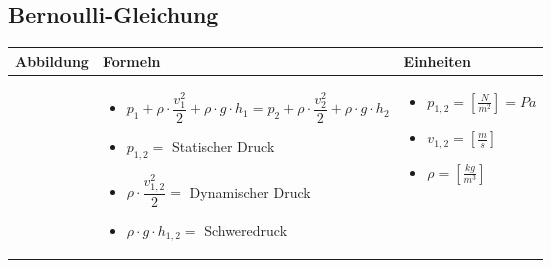 \subsection{Bernoulli-Gleichung}				%
	\begin{tabular}{ | m{6cm} | m{8cm} | m{4cm} | }
		\hline
		Abbildung & Formeln & Einheiten \\ \hline
		\hline
		\begin{minipage}{.3\textwidth}
			\tabImg[width=6.2cm]{images/bernoulli}
		\end{minipage}
		&
		\begin{itemize}
			\item$p_{1}+\rho\cdot \dfrac{v_{1}^2}{2}+\rho\cdot g\cdot h_{1}=p_{2}+\rho\cdot \dfrac{v_{2}^2}{2}+\rho\cdot g\cdot h_{2}$	\item$p_{1,2}=$ Statischer Druck
			\item$\rho\cdot \dfrac{v_{1,2}^2}{2}=$ Dynamischer Druck
			\item$\rho\cdot g\cdot h_{1,2}=$ Schweredruck	
		\end{itemize}
		& 
		\begin{itemize}
			\item $p_{1,2}=[\frac{N}{m^2}]=Pa$
			\item $v_{1,2}=[\frac{m}{s}]$	
			\item $\rho=[\frac{kg}{m^3}]$	
		\end{itemize}
		\\ \hline
	\end{tabular}


